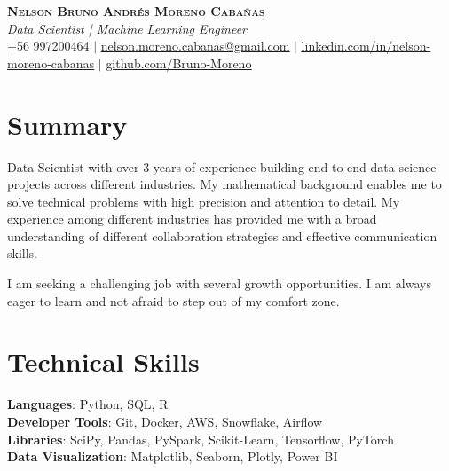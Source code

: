 \documentclass[letterpaper,11pt]{article}
\begin{document}

\begin{center}
    \textbf{\Huge \scshape Nelson Bruno Andrés Moreno Cabañas} \\ \vspace{3pt}
    \large \textit{Data Scientist | Machine Learning Engineer} \\ \vspace{3pt}
    \small +56 997200464 $|$ \href{mailto:nelson.moreno.cabanas@gmail.com}{\underline{nelson.moreno.cabanas@gmail.com}} $|$ 
    \href{https://linkedin.com/in/nelson-moreno-cabanas/}{\underline{linkedin.com/in/nelson-moreno-cabanas}} $|$
    \href{https://github.com/Bruno-Moreno}{\underline{github.com/Bruno-Moreno}}
\end{center}

\section*{Summary}
Data Scientist with over 3 years of experience building end-to-end data science projects across different industries. My mathematical background enables me to solve technical problems with high precision and attention to detail. My experience among different industries has provided me with a broad understanding of different collaboration strategies and effective communication skills. 

\vspace{0.3cm}

I am seeking a challenging job with several growth opportunities. I am always eager to learn and not afraid to step out of my comfort zone.

\section{Technical Skills}
 \begin{itemize}[leftmargin=0.15in, label={}]
    \small{\item{
     \textbf{Languages}{: Python, SQL, R} \\
     \textbf{Developer Tools}{: Git, Docker, AWS, Snowflake, Airflow} \\
     \textbf{Libraries}{: SciPy, Pandas, PySpark, Scikit-Learn, Tensorflow, PyTorch} \\
     \textbf{Data Visualization}{: Matplotlib, Seaborn, Plotly, Power BI} \\
    }}
 \end{itemize}
\end{document}
